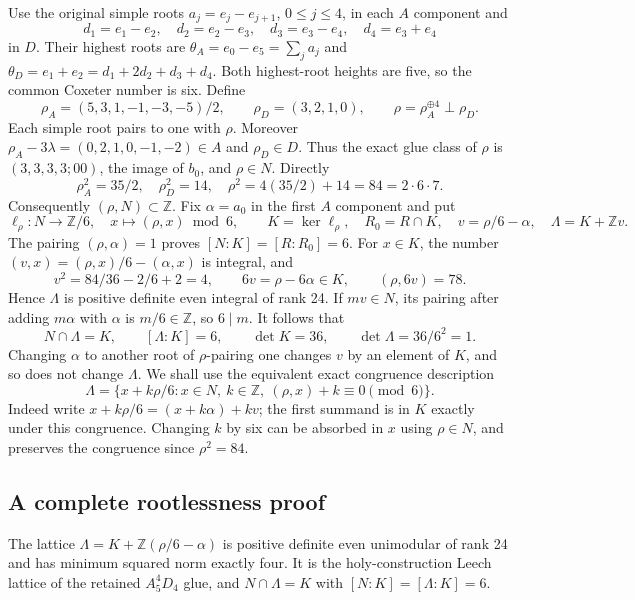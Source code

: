 Use the original simple roots $a_j=e_j-e_{j+1}$, $0\le j\le4$,
in each $A$ component and
\[
 d_1=e_1-e_2,\quad d_2=e_2-e_3,\quad
 d_3=e_3-e_4,\quad d_4=e_3+e_4
\]
in $D$. Their highest roots are
$\theta_A=e_0-e_5=\sum_ja_j$ and
$\theta_D=e_1+e_2=d_1+2d_2+d_3+d_4$.
Both highest-root heights are five, so the common Coxeter number
is six. Define
\[
 \rho_A=(5,3,1,-1,-3,-5)/2,\qquad
 \rho_D=(3,2,1,0),\qquad \rho=\rho_A^{\oplus4}\perp\rho_D.
 \label{esnl:eq:rho}
\]
Each simple root pairs to one with $\rho$.
Moreover $\rho_A-3\lambda=(0,2,1,0,-1,-2)\in A$ and
$\rho_D\in D$. Thus the exact glue class of $\rho$ is
$(3,3,3,3;00)$, the image of $b_0$, and $\rho\in N$.
Directly
\[
 \rho_A^2=35/2,\quad \rho_D^2=14,\quad
 \rho^2=4(35/2)+14=84=2\cdot6\cdot7.
\]
Consequently $(\rho,N)\subset\mathbb Z$.
Fix $\alpha=a_0$ in the first $A$ component and put
\[
 \ell_\rho:N\to\mathbb Z/6,\quad x\mapsto(\rho,x)\bmod6,\qquad
 K=\ker\ell_\rho,\quad R_0=R\cap K,\quad
 v=\rho/6-\alpha,\quad \Lambda=K+\mathbb Z v.
 \tag{NL1}
\]
The pairing $(\rho,\alpha)=1$ proves
$[N:K]=[R:R_0]=6$. For $x\in K$, the number
$(v,x)=(\rho,x)/6-(\alpha,x)$ is integral, and
\[
 v^2=84/36-2/6+2=4,\qquad
 6v=\rho-6\alpha\in K,\qquad(\rho,6v)=78.
\]
Hence $\Lambda$ is positive definite even integral of rank 24.
If $mv\in N$, its pairing after adding $m\alpha$ with $\alpha$
is $m/6\in\mathbb Z$, so $6\mid m$.
It follows that
\[
 N\cap\Lambda=K,\qquad [\Lambda:K]=6,\qquad
 \det K=36,\qquad \det\Lambda=36/6^2=1.
 \tag{NL2}
\]
Changing $\alpha$ to another root of $\rho$-pairing one changes
$v$ by an element of $K$, and so does not change $\Lambda$.
We shall use the equivalent exact congruence description
\[
 \Lambda=\{x+k\rho/6:x\in N,\ k\in\mathbb Z,\
                                (\rho,x)+k\equiv0\pmod6\}.
 \tag{NL3}
\]
Indeed write $x+k\rho/6=(x+k\alpha)+kv$; the first summand
is in $K$ exactly under this congruence. Changing $k$ by six
can be absorbed in $x$ using $\rho\in N$, and preserves the
congruence since $\rho^2=84$.

\subsection{A complete rootlessness proof}

\begin{theorem}
\label{esnl:thm:leech-neighbor}
The lattice $\Lambda=K+\mathbb Z(\rho/6-\alpha)$ is positive
definite even unimodular of rank 24 and has minimum squared norm
exactly four. It is the holy-construction Leech lattice of the
retained $A_5^4D_4$ glue, and
$N\cap\Lambda=K$ with $[N:K]=[\Lambda:K]=6$.
\end{theorem}

